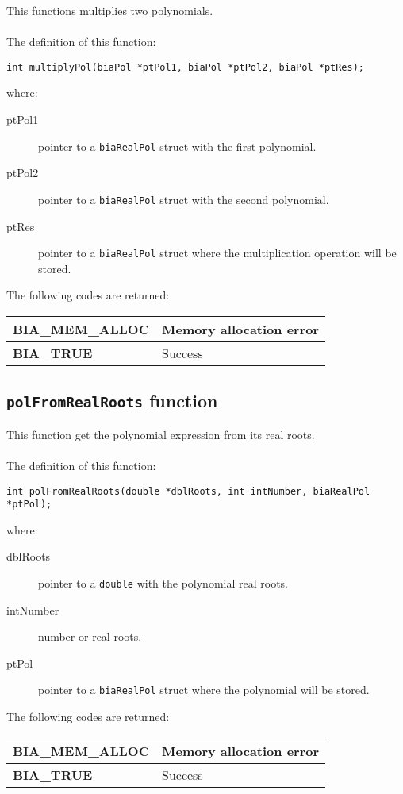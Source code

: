 This functions multiplies two polynomials.\\ \\
%
The definition of this function:
%
\begin{verbatim}
int multiplyPol(biaPol *ptPol1, biaPol *ptPol2, biaPol *ptRes);
\end{verbatim}
%
where:
%
\begin{description}
\item[ptPol1] pointer to a \texttt{biaRealPol} struct with the first polynomial.
\item[ptPol2] pointer to a \texttt{biaRealPol} struct with the second polynomial.
\item[ptRes] pointer to a \texttt{biaRealPol} struct where the multiplication operation will be stored.
\end{description}
%
The following codes are returned:
%
\begin{center}
\begin{tabular}{|l|l|}
\hline
\textbf{BIA\_MEM\_ALLOC} & Memory allocation error \\
\hline
\textbf{BIA\_TRUE} & Success \\
\hline
\end{tabular}
\end{center}
%
%

\subsection{\texttt{polFromRealRoots} function}

This function get the polynomial expression from its real roots.\\ \\
%
The definition of this function:
%
\begin{verbatim}
int polFromRealRoots(double *dblRoots, int intNumber, biaRealPol *ptPol);
\end{verbatim}
%
where:
%
\begin{description}
\item[dblRoots] pointer to a \texttt{double} with the polynomial real roots.
\item[intNumber] number or real roots.
\item[ptPol] pointer to a \texttt{biaRealPol} struct where the polynomial will be stored.
\end{description}
%
The following codes are returned:
%
\begin{center}
\begin{tabular}{|l|l|}
\hline
\textbf{BIA\_MEM\_ALLOC} & Memory allocation error \\
\hline
\textbf{BIA\_TRUE} & Success \\
\hline
\end{tabular}
\end{center}
%
%
%

